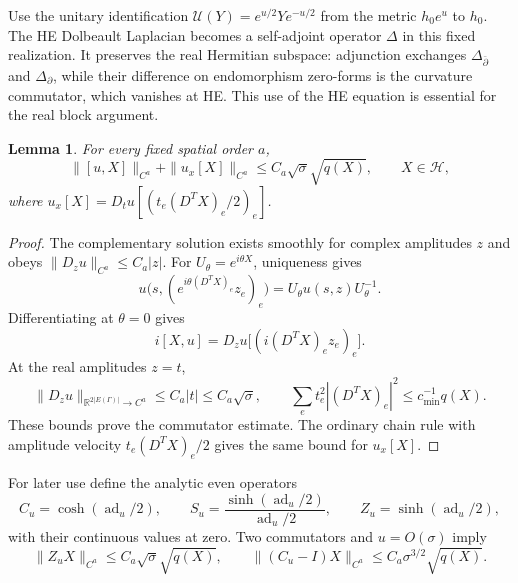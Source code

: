 \documentclass[11pt]{amsart}
\newtheorem{lemma}[theorem]{Lemma}
\theoremstyle{definition}
\theoremstyle{remark}
\newcommand{\RR}{\mathbb R}
\newcommand{\HH}{\mathcal H}
\newcommand{\db}{\bar\partial}
\newcommand{\ad}{\operatorname{ad}}
\begin{document}
Use the unitary identification
\(\mathscr U(Y)=e^{u/2}Ye^{-u/2}\) from the metric \(h_0e^u\)
to \(h_0\). The HE Dolbeault Laplacian becomes a self-adjoint
operator \(\Delta\) in this fixed realization. It preserves the
real Hermitian subspace: adjunction exchanges \(\Delta_{\db}\) and
\(\Delta_\partial\), while their difference on endomorphism
zero-forms is the curvature commutator, which vanishes at HE.
This use of the HE equation is essential for the real block argument.

\begin{lemma}\label{lem03:phase}
For every fixed spatial order \(a\),
\begin{equation}\label{eq03:phase}
 \|[u,X]\|_{C^a}+\|u_x[X]\|_{C^a}
       \le C_a\sqrt\sigma\sqrt{q(X)},\qquad X\in\HH,
\end{equation}
where \(u_x[X]=D_tu[(t_e(D^TX)_e/2)_e]\).
\end{lemma}

\begin{proof}
The complementary solution exists smoothly for complex amplitudes
\(z\) and obeys \(\|D_zu\|_{C^a}\le C_a|z|\).
For \(U_\theta=e^{i\theta X}\), uniqueness gives
\[
 u\bigl(s,(e^{i\theta(D^TX)_e}z_e)_e\bigr)
       =U_\theta u(s,z)U_\theta^{-1}.
\]
Differentiating at \(\theta=0\) gives
\[
 i[X,u]=D_zu\bigl[(i(D^TX)_ez_e)_e\bigr].
\]
At the real amplitudes \(z=t\),
\[
 \|D_zu\|_{\RR^{2|E(\Gamma)|}\to C^a}
       \le C_a|t|\le C_a\sqrt\sigma,\qquad
 \sum_et_e^2|(D^TX)_e|^2\le c_{\min}^{-1}q(X).
\]
These bounds prove the commutator estimate. The ordinary chain rule
with amplitude velocity \(t_e(D^TX)_e/2\) gives the same bound
for \(u_x[X]\).
\end{proof}

For later use define the analytic even operators
\begin{equation}\label{eq03:exponential}
 C_u=\cosh(\ad_u/2),\qquad
 S_u=\frac{\sinh(\ad_u/2)}{\ad_u/2},\qquad
 Z_u=\sinh(\ad_u/2),
\end{equation}
with their continuous values at zero. Two commutators and
\(u=O(\sigma)\) imply
\begin{equation}\label{eq03:evenbounds}
 \|Z_uX\|_{C^a}\le C_a\sqrt\sigma\sqrt{q(X)},\qquad
 \|(C_u-I)X\|_{C^a}\le C_a\sigma^{3/2}\sqrt{q(X)}.
\end{equation}
\end{document}
